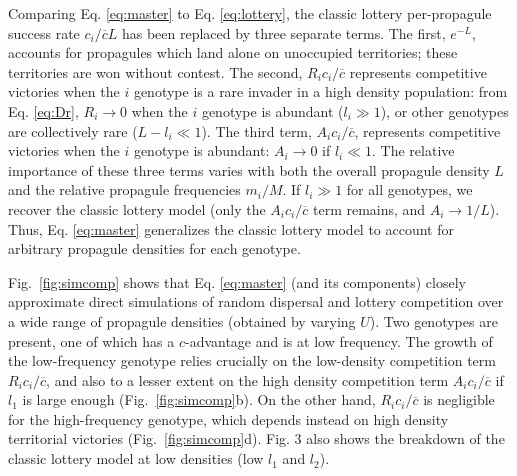 \documentclass[11pt]{article}
\begin{document}
Comparing Eq. \eqref{eq:master} to Eq. \eqref{eq:lottery}, the classic lottery per-propagule success rate $c_i/\overline{c}L$ has been replaced by three separate terms. The first, $e^{-L}$, accounts for propagules which land alone on unoccupied territories; these territories are won without contest. The second, $R_i c_i/\overline{c}$ represents competitive victories when the $i$ genotype is a rare invader in a high density population: from Eq. \eqref{eq:Dr}, $R_i\rightarrow 0$ when the $i$ genotype is abundant ($l_i\gg 1$), or other genotypes are collectively rare ($L-l_i\ll 1$). The third term, $A_ic_i/\overline{c}$, represents competitive victories when the $i$ genotype is abundant: $A_i\rightarrow 0$ if $l_i\ll 1$. The relative importance of these three terms varies with both the overall propagule density $L$ and the relative propagule frequencies $m_i/M$. If $l_i\gg 1$ for all genotypes, we recover the classic lottery model (only the $A_ic_i/\overline{c}$ term remains, and $A_i\rightarrow 1/L$). Thus, Eq. \eqref{eq:master} generalizes the classic lottery model to account for arbitrary propagule densities for each genotype. 

Fig.~\ref{fig:simcomp} shows that Eq. \eqref{eq:master} (and its components) closely approximate direct simulations of random dispersal and lottery competition over a wide range of propagule densities (obtained by varying $U$). Two genotypes are present, one of which has a $c$-advantage and is at low frequency. The growth of the low-frequency genotype relies crucially on the low-density competition term $R_i c_i/\overline{c}$, and also to a lesser extent on the high density competition term $A_i c_i/\overline{c}$ if $l_1$ is large enough (Fig.~\ref{fig:simcomp}b). On the other hand, $R_i c_i/\overline{c}$ is negligible for the high-frequency genotype, which depends instead on high density territorial victories (Fig.~\ref{fig:simcomp}d). Fig. 3 also shows the breakdown of the classic lottery model at low densities (low $l_1$ and $l_2$).
\end{document}
